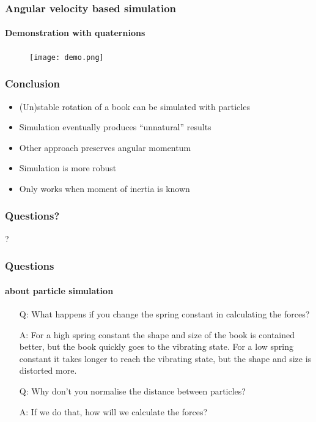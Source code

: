 \documentclass{beamer}
\begin{document}
\begin{frame}
 \frametitle{Angular velocity based simulation}
 \framesubtitle{Demonstration with quaternions}
 \begin{figure}
  \centering
  \texttt{[image: demo.png]}
 \end{figure}
\end{frame}

\begin{frame}
 \frametitle{Conclusion}
 \begin{itemize}
  \item (Un)stable rotation of a book can be simulated with particles
  \item Simulation eventually produces ``unnatural'' results
  \item Other approach preserves angular momentum
  \item Simulation is more robust
  \item Only works when moment of inertia is known
 \end{itemize}
\end{frame}


 \begin{frame}
  \frametitle{Questions?}
  \begin{center}
   \Huge{?}
  \end{center}
 \end{frame}

 \begin{frame}
  \frametitle{Questions}
  \framesubtitle{about particle simulation}
  \begin{itemize}
   \item[Q:] What happens if you change the spring constant in calculating the forces?
   \item[A:] For a high spring constant the shape and size of the book is contained better, but the book quickly goes to the vibrating state. For a low spring constant it takes longer to reach the vibrating state, but the shape and size is distorted more.
   \item[Q:] Why don't you normalise the distance between particles?
   \item[A:] If we do that, how will we calculate the forces?
  \end{itemize}
 \end{frame}
\end{document}
